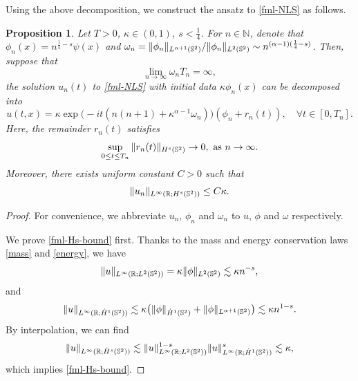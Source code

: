 \documentclass[11pt, reqno]{amsart}
\numberwithin{equation}{section}
\newcommand{\R}{\Bbb R}
\newcommand{\N}{\mathbb N}
\newtheorem{proposition}[theorem]{Proposition}
\theoremstyle{definition}
\theoremstyle{remark}
\begin{document}
{	
Using the above decomposition, we construct the ansatz to \eqref{fml-NLS} as follows.
\begin{proposition}\label{prop-ansatz}
Let $T>0$, $\kappa\in(0,1)$, $s<\frac{1}{4}$. For $n\in\N$, denote that $\phi_n(x)=n^{\frac{1}{4}-s}\psi(x)$ and $\omega_n = \|\phi_n\|_{L^{\alpha+1}(\Bbb S^2)}/\|\phi_n\|_{L^2(\Bbb S^2)} \sim n^{(\alpha-1)(\frac{1}{4}-s)}$. Then, suppose that 
\begin{equation*}
\lim\limits_{n\to\infty} \omega_n T_n = \infty,
\end{equation*}
the solution $u_n(t)$ to \eqref{fml-NLS} with initial data $\kappa\phi_n(x)$ can be decomposed into
\begin{equation}\label{fml-ansa}
u(t,x) = \kappa \exp\big( -it(n(n+1)+\kappa^{\alpha-1}\omega_n) \big)(\phi_n+r_n(t)),\quad \forall t\in[0,T_n].
\end{equation}
Here, the remainder $r_n(t)$ satisfies
\begin{equation}\label{fml-ansa-rem}
\sup_{0\le t\le T_n}\|r_n(t)\|_{H^s(\Bbb S^2)}\to0,\,\,\text{as}\,\, n\to \infty.
\end{equation}
Moreover, there exists uniform constant $C>0$ such that
\begin{equation}\label{fml-Hs-bound}
\|u_n\|_{L^\infty(\R;H^s(\Bbb S^2))} \le C\kappa.
\end{equation}
\end{proposition}

\begin{proof}
For convenience, we abbreviate $u_n$, $\phi_n$ and $\omega_n$ to $u$, $\phi$ and $\omega$ respectively. 
		
We prove \eqref{fml-Hs-bound} first. Thanks to the mass and energy conservation laws \eqref{mass} and \eqref{energy}, we have
\begin{equation*}
\|u\|_{L^\infty(\R;L^2(\Bbb S^2))} = \kappa\|\phi\|_{L^2(\Bbb S^2)}\lesssim \kappa n^{-s}, 
\end{equation*}
and
\begin{equation*}
\|u\|_{L^\infty(\R;\dot{H}^1(\Bbb S^2))} \lesssim \kappa\big(\|\phi\|_{\dot{H}^1(\Bbb S^2)}+\|\phi\|_{L^{\alpha+1}(\Bbb S^2)}\big)\lesssim \kappa n^{1-s}.
\end{equation*}
By interpolation, we can find
\begin{equation*}
\|u\|_{L^\infty(\R;\dot{H}^s(\Bbb S^2))} \lesssim \|u\|^{1-s}_{L^\infty(\R;L^2(\Bbb S^2))} \|u\|^{s}_{L^\infty(\R;\dot{H}^1(\Bbb S^2))} \lesssim \kappa,
\end{equation*}
which implies  \eqref{fml-Hs-bound}.
		

\end{proof}}
\end{document}
